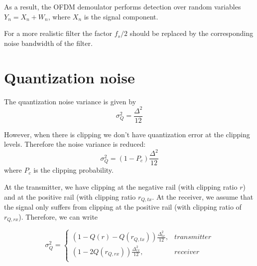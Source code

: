 \documentclass[a4paper]{article}
\begin{document}
As a result, the OFDM demoulator performs detection over random variables $Y_n = X_n + W_n$, where $X_n$ is the signal component.

For a more realistic filter the factor $f_s/2$ should be replaced by the corresponding noise bandwidth of the filter.


\section{Quantization noise}

The quantization noise variance is given by
\begin{equation}
\sigma^2_Q = \frac{\Delta^2}{12}
\end{equation}

However, when there is clipping we don't have quantization error at the clipping levels. Therefore the noise variance is reduced:
\begin{equation}
\sigma^2_Q = (1-P_c)\frac{\Delta^2}{12}
\end{equation}
where $P_c$ is the clipping probability.

At the transmitter, we have clipping at the negative rail (with clipping ratio $r$) and at the positive rail (with clipping ratio $r_{Q,tx}$. At the receiver, we assume that the signal only suffers from clipping at the positive rail (with clipping ratio of $r_{Q,rx}$). Therefore, we can write

\begin{equation}
\sigma^2_Q = \begin{cases}
(1-Q(r)-Q(r_{Q,tx}))\frac{\Delta_{tx}^2}{12}, & transmitter \\
(1-2Q(r_{Q,rx}))\frac{\Delta_{rx}^2}{12}, & receiver \\
\end{cases}
\end{equation}
\end{document}
